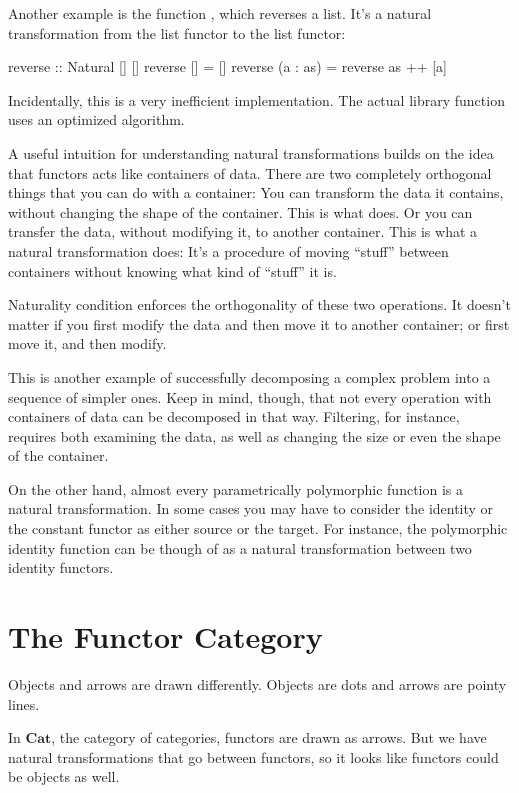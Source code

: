 \documentclass[DaoFP]{subfiles}
\begin{document}
Another example is the function , which reverses a list. It's a natural transformation from the list functor to the list functor:
\begin{haskell}
reverse :: Natural [] []
reverse [] = []
reverse (a : as) = reverse as ++ [a]
\end{haskell}
Incidentally, this is a very inefficient implementation. The actual library function uses an optimized algorithm.

A useful intuition for understanding natural transformations builds on the idea that functors acts like containers of data. There are two completely orthogonal things that you can do with a container: You can transform the data it contains, without changing the shape of the container. This is what  does. Or you can transfer the data, without modifying it, to another container. This is what a natural transformation does: It's a procedure of moving ``stuff'' between containers without knowing what kind of ``stuff'' it is. 

Naturality condition enforces the orthogonality of these two operations. It doesn't matter if you first modify the data and then move it to another container; or first move it, and then modify. 

This is another example of successfully decomposing a complex problem into a sequence of simpler ones. Keep in mind, though, that not every operation with containers of data can be decomposed in that way. Filtering, for instance, requires both examining the data, as well as changing the size or even the shape of the container. 

On the other hand, almost every parametrically polymorphic function is a natural transformation. In some cases you may have to consider the identity or the constant functor as either source or the target. For instance, the polymorphic identity function can be though of as a natural transformation between two identity functors.

\section{The Functor Category}

Objects and arrows are drawn differently. Objects are dots and arrows are pointy lines.

In $\mathbf{Cat}$, the category of categories, functors are drawn as arrows. But we have natural transformations that go between functors, so it looks like functors could be objects as well. 
\end{document}
